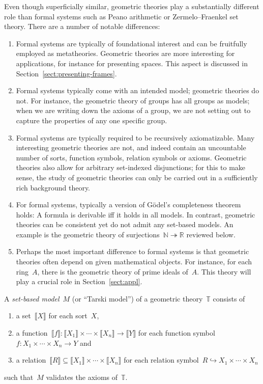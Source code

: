 \documentclass{ws-rv9x6}
\newcommand{\NN}{\mathbb{N}}
\newcommand{\RR}{\mathbb{R}}
\newcommand{\TT}{\mathbb{T}}
\renewcommand{\_}{\mathpunct{.}}
\newcommand{\?}{\,{:}\,}
\newcommand{\brak}[1]{{\llbracket{#1}\rrbracket}}
\begin{document}
Even though superficially similar, geometric theories play a
substantially different role than formal systems such as Peano arithmetic or
Zermelo--Fraenkel set theory. There are a number of notable differences:
\begin{enumerate}
\item Formal systems are typically of foundational interest and can be
fruitfully employed as metatheories. Geometric theories are more interesting
for applications, for instance for presenting spaces. This aspect is discussed
in Section~\ref{sect:presenting-frames}.
\item Formal systems typically come with an intended model; geometric theories
do not. For instance, the geometric theory of groups has all groups as models;
when we are writing down the axioms of a group, we are not setting out to
capture the properties of any one specific group.
\item Formal systems are typically required to be recursively
axiomatizable. Many interesting geometric theories are not, and indeed contain
an uncountable number of sorts, function symbols, relation symbols or axioms. Geometric theories also allow for arbitrary
set-indexed disjunctions; for this to make sense, the study of geometric
theories can only be carried out in a sufficiently rich background theory.
\item For formal systems, typically a version of Gödel's completeness theorem
holds: A formula is derivable iff it holds in all models. In contrast,
geometric theories can be consistent yet do not admit any set-based models. An
example is the geometric theory of surjections~$\NN \twoheadrightarrow \RR$
reviewed below.
\item Perhaps the most important difference to formal systems is that geometric
theories often depend on given mathematical objects. For instance, for each
ring~$A$, there is the geometric theory of prime ideals of~$A$. This theory
will play a crucial role in Section~\ref{sect:appl}.
\end{enumerate}

\begin{definition}A \emph{set-based model}~$M$ (or ``Tarski model'') of a
geometric theory~$\TT$ consists of
\begin{enumerate}
  \item a set~$\brak{X}$ for each sort~$X$,
  \item a function~$\brak{f} : \brak{X_1} \times \cdots \times \brak{X_n} \to
  \brak{Y}$
  for each function symbol~$f : X_1 \times \cdots \times X_n \to Y$ and
  \item a relation~$\brak{R} \subseteq \brak{X_1} \times \cdots \times \brak{X_n}$
  for each relation symbol~$R \hookrightarrow X_1 \times \cdots \times X_n$
\end{enumerate}
such that~$M$ validates the axioms of~$\TT$.
\end{definition}
\end{document}
